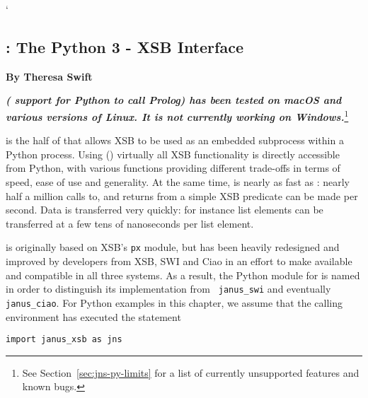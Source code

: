 `\setcounter{secnumdepth}{3}
\begin{center}
\chapter{\janus{}: The Python 3 - XSB Interface} \label{chap:janus-py} 
\end{center}

\vspace*{-.30in} 
\begin{center}
{\Large {\bf  \jnsversion}}
\end{center}

\begin{center}
  {\Large {\bf By Theresa Swift}}
\end{center}


\noindent
    {\large {\bf {\em \januspy{} (\janus{} support for Python to call
          Prolog) has been tested on macOS and various versions of
        Linux. It is not currently working on Windows.}}\footnote{ See
    Section~\ref{sec:jns-py-limits} for a list of currently
    unsupported features and known bugs.}}

\januspy{} is the half of \janus{} that allows XSB to be used as an
embedded subprocess within a Python process. Using \januspy()
virtually all XSB functionality is directly accessible from Python, with
various \januspy{} functions providing different trade-offs in terms of
speed, ease of use and generality.  At the same time, \januspy{} is
nearly as fast as \janusplg : nearly half a million calls to,
and returns from a simple XSB predicate can be made per second.  Data
is transferred very quickly: for instance list elements can be
transferred at a few tens of nanoseconds per list element.

\januspy{} is originally based on XSB's {\tt px} module, but has been
heavily redesigned and improved by developers from XSB, SWI and Ciao
in an effort to make \janus{} available and compatible in all three
systems.  As a result, the Python module for \januspy{} is named
\janusxsb{} in order to distinguish its implementation from {\tt
  janus\_swi} and eventually {\tt janus\_ciao}.  For Python examples
in this chapter, we assume that the calling environment has executed
the statement
\begin{verbatim} 
import janus_xsb as jns
\end{verbatim}



